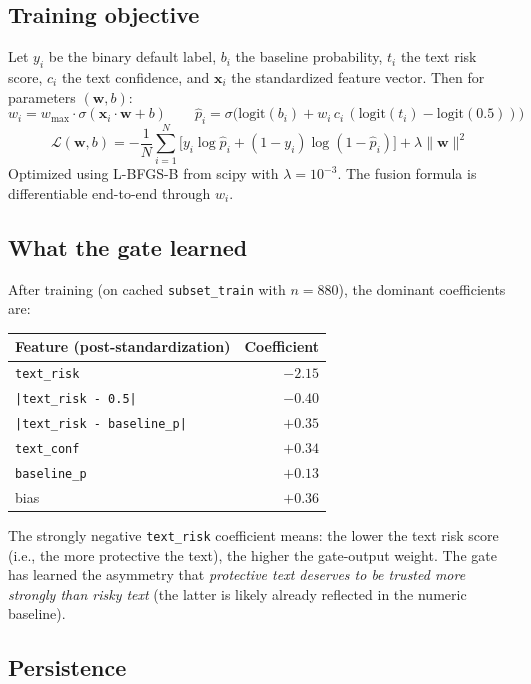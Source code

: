 \documentclass[11pt,a4paper]{article}
\begin{document}
\subsection{Training objective}

Let $y_i$ be the binary default label, $b_i$ the baseline probability, $t_i$
the text risk score, $c_i$ the text confidence, and $\mathbf{x}_i$ the
standardized feature vector. Then for parameters $(\mathbf{w}, b)$:
\[
w_i = w_{\max} \cdot \sigma(\mathbf{x}_i \cdot \mathbf{w} + b) \quad\quad
\hat{p}_i = \sigma\bigl(\mathrm{logit}(b_i) + w_i \, c_i \, (\mathrm{logit}(t_i) - \mathrm{logit}(0.5))\bigr)
\]
\[
\mathcal{L}(\mathbf{w}, b) = -\frac{1}{N}\sum_{i=1}^{N} \bigl[y_i \log \hat{p}_i + (1-y_i)\log(1-\hat{p}_i)\bigr] + \lambda \|\mathbf{w}\|^2
\]
Optimized using L-BFGS-B from scipy with $\lambda = 10^{-3}$. The fusion
formula is differentiable end-to-end through $w_i$.

\subsection{What the gate learned}

After training (on cached \texttt{subset\_train} with $n = 880$), the dominant
coefficients are:

\begin{center}
\begin{tabular}{lr}
\toprule
\textbf{Feature (post-standardization)} & \textbf{Coefficient} \\
\midrule
\texttt{text\_risk} & $-2.15$ \\
\texttt{|text\_risk - 0.5|} & $-0.40$ \\
\texttt{|text\_risk - baseline\_p|} & $+0.35$ \\
\texttt{text\_conf} & $+0.34$ \\
\texttt{baseline\_p} & $+0.13$ \\
bias & $+0.36$ \\
\bottomrule
\end{tabular}
\end{center}
\noindent
The strongly negative \texttt{text\_risk} coefficient means: the lower the
text risk score (i.e., the more protective the text), the higher the
gate-output weight. The gate has learned the asymmetry that
\emph{protective text deserves to be trusted more strongly than risky text}
(the latter is likely already reflected in the numeric baseline).

\subsection{Persistence}
\end{document}
